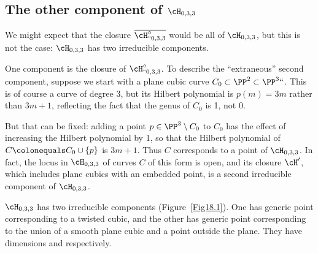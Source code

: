 \subsection*{The other component of
\texorpdfstring{$\cH_{0,3,3}$}{$H_{0,3,3}$}}

\hskip-2.5pt
We might expect that the closure $\overline{\cH^\circ_{``0,3,3}}$
would be all of $\cH_{0,3,3}$, but this is not the case:  $\cH_{0,3,3}$
has two irreducible components.

\hskip-0.5pt
One component is the closure of $\cH^\circ_{``0,3,3}$. 
\hskip-1pt To describe the \kern-0.3pt ``extraneous'' \kern-0.3pt 
second component, suppose we start with a plane cubic
curve $C_0 \subset \PP^2 \subset \PP^3` `$. This is of course a curve of
degree 3, but its Hilbert polynomial is $p(m) = 3m$ rather than $3m+1$,
reflecting the fact that the genus of $C_0$ is 1, not 0.

But that can be fixed: adding a point $p \in \PP^3 \setminus C_0$
to $C_0$ has the effect of increasing the Hilbert polynomial by 1, so
that the Hilbert polynomial of $C \colonequals  C_0\cup \{p\}$ is $3m+1$. Thus
$C$  corresponds to a point of $\cH_{0,3,3}$. In fact, the locus
in $\cH_{0,3,3}$ of curves $C$ of this form is open, and its closure
$\cH'$, which includes plane cubics with an embedded point, is a second
irreducible component of $\cH_{0,3,3}$.


\begin{theorem}
$\cH_{0,3,3}$ has two irreducible components
{\normalfont(Figure~\ref{Fig18.1})}. One
has generic point corresponding to  a twisted cubic,
and the other has generic point corresponding to the union of a smooth
plane cubic and a point outside the plane.
They have
dimensions
\1\2 and \1\5 respectively.
\end{theorem}


